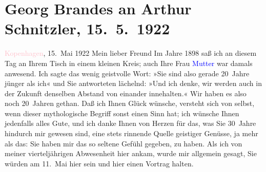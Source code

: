 

               \section[Georg Brandes an Arthur Schnitzler, 15. 5. 1922]{ Georg Brandes an Arthur Schnitzler, 15. 5. 1922}\nopagebreak{}\rehead{ }\normalsize\beginnumbering{} \toendnotes[C]{\smallbreak\pagebreak[2]} \toendnotes[C]{\smallbreak}\pstart
           \raggedleft{}{\pb}\textcolor{pink}{Kopenhagen}{}\ledrightnote{\textcolor{pink}{Kopenhagen}}, 15. Mai 1922\pend
           \pstart{}Mein lieber Freund\pend\pstart
           Im Jahre 1898 saß ich an diesem Tag an Ihrem Tisch in einem kleinen
               Kreis; auch Ihre Frau \textcolor{blue}{Mutter}{}
               war damals anwesend. Ich sagte das wenig geistvolle Wort: »Sie sind also gerade
               20 Jahre jünger als ich« und Sie antworteten lächelnd: »Und ich denke, wir werden
               auch in der Zukunft denselben Abstand von einander innehalten.«\pend
           \pstart
           Wir haben es also noch 20 Jahren gethan. Daß ich Ihnen Glück wünsche, versteht sich
               von selbst, wenn dieser mythologische Begriff sonst einen Sinn hat; ich wünsche Ihnen
               jedenfalls alles Gute, und ich danke Ihnen von Herzen für das, was Sie 30 Jahre
               hindurch mir gewesen sind, eine stets rinnende Quelle geistiger Genüsse, ja mehr als
               das: Sie haben mir das so seltene Gefühl gegeben, \emph{\label{K_L02383_1v}\label{K_L02383_1h}} zu haben.\pend
           \pstart
           Als ich von meiner vierteljährigen Abwesenheit hier ankam, wurde mir allgemein
               gesagt, Sie würden am 11. Mai hier sein und hier einen Vortrag halten.
